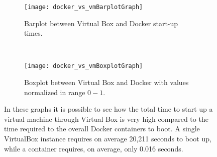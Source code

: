 \begin{figure}[t]
    \centering
    \begin{subfigure}[b]{0.4\textwidth}
        \texttt{[image: docker\_vs\_vmBarplotGraph]}
        \caption{Barplot between Virtual Box and Docker start-up times.}
        \label{chap:tests:sec:dockervsvb:img:barplot}
    \end{subfigure}
    ~
    \begin{subfigure}[b]{0.4\textwidth}
        \texttt{[image: docker\_vs\_vmBoxplotGraph]}
        \caption{Boxplot between Virtual Box and Docker with values normalized 
in range $0-1$.}
        \label{chap:tests:sec:dockervsvb:img:boxplot}
    \end{subfigure}
    \caption[Virtual Box vs Docker start up comparison]{In these graphs it is
      possible to see how the total time to start up a virtual machine through
      Virtual Box is very high compared to the time required to the overall
      Docker containers to boot. A single VirtualBox instance requires on
      average 20,211 seconds to boot up, while a container requires, on average,
      only 0.016 seconds.}
    \label{chap:tests:sec:dockervsvb:subimg:plots}
\end{figure}

\begin{table}[h]
\centering
{}
\caption[Docker vs Virtual Box start up times comparison]{Docker vs Virtual Box
  start up times comparison. Is possible to see how the overall time required to
  start $100$ containers is less than the time to start one traditional virtual
  machine. The overall time required by the traditional virtualization system is
  approximately of 33 minutes, witch gives a significant insight of how much
  time is required to create and boot a virtualized environment.}
\label{chap:tests:sec:dockervsvb:tab:startup}
\end{table}



